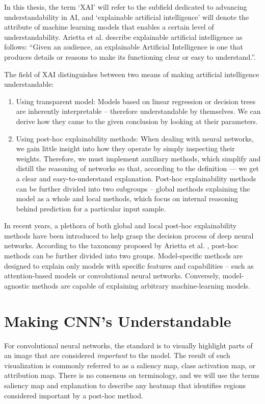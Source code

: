 In this thesis, the term `XAI' will refer to the subfield dedicated to advancing understandability in AI, and `explainable artificial intelligence' will denote the attribute of machine learning models that enables a certain level of understandability.
Arietta et al. \cite{arrieta-taxonomy} describe explainable artificial intelligence as follows: ``Given an audience, an explainable Artificial Intelligence is one that produces details or reasons to make its functioning clear or easy to understand.''.

The field of XAI distinguishes between two means of making artificial intelligence understandable:
\begin{enumerate}
    \item Using transparent model: Models based on linear regression or decision trees are inherently interpretable -- therefore understandable by themselves. We can derive how they came to the given conclusion by looking at their parameters.
    \item Using post-hoc explainability methods: When dealing with neural networks, we gain little insight into how they operate by simply inspecting their weights. Therefore, we must implement auxiliary methods, which simplify and distill the reasoning of networks so that, according to the definition --- we get a clear and easy-to-understand explanation. Post-hoc explainability methods can be further divided into two subgroups -- global methods explaining the model as a whole and local methods, which focus on internal reasoning behind prediction for a particular input sample.
\end{enumerate}

In recent years, a plethora of both global and local post-hoc explainability methods have been introduced to help grasp the decision process of deep neural networks.
According to the taxonomy proposed by Arietta et al. \cite{arrieta-taxonomy}, post-hoc methods can be further divided into two groups. 
Model-specific methods are designed to explain only models with specific features and capabilities -- such as attention-based models or convolutional neural networks.
Conversely, model-agnostic methods are capable of explaining arbitrary machine-learning models.

\section{Making CNN's Understandable}\label{sec:xai-cnn}

For convolutional neural networks, the standard is to visually highlight parts of an image that are considered \emph{important} to the model.
The result of such visualization is commonly referred to as a saliency map, class activation map, or attribution map.
There is no consensus on terminology, and we will use the terms saliency map and explanation to describe any heatmap that identifies regions considered important by a post-hoc method.

